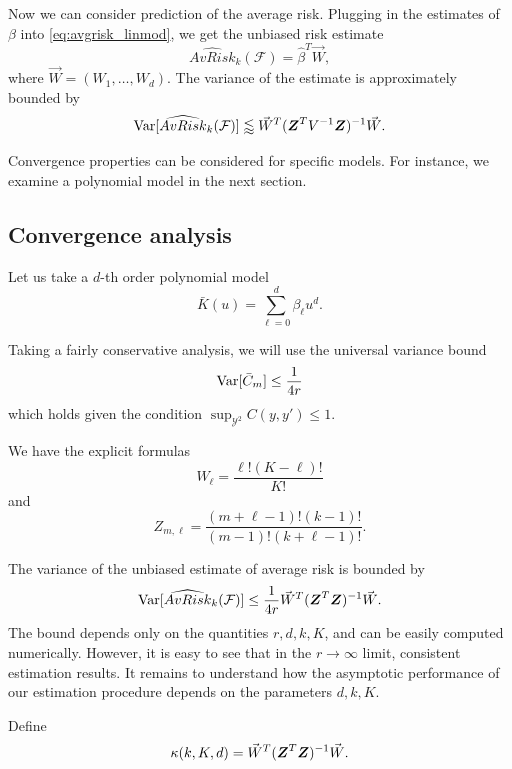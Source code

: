 \documentclass[12pt]{article}
\begin{document}
Now we can consider prediction of the average risk.
Plugging in the estimates of $\beta$ into \eqref{eq:avgrisk_linmod}, we get the unbiased risk estimate
\[
\widehat{AvRisk}_k(\mathcal{F}) = \hat{\beta}^T \vec{W},
\]
where $\vec{W} = (W_1,\hdots, W_d)$.
The variance of the estimate is approximately bounded by
\[
\text{Var}[\widehat{AvRisk}_k(\mathcal{F})] \lessapprox \vec{W}^T (\boldsymbol{Z}^T V^{-1} \boldsymbol{Z})^{-1} \vec{W}.
\]

Convergence properties can be considered for specific models.  For
instance, we examine a polynomial model in the next section.

\subsection{Convergence analysis}

Let us take a $d$-th order polynomial model
\[
\bar{K}(u) = \sum_{\ell = 0}^d \beta_\ell u^d.
\]

Taking a fairly conservative analysis, we will use the universal variance bound
\[
\text{Var}[\bar{C}_m] \leq \frac{1}{4r}
\]
which holds given the condition $\sup_{\mathcal{Y}^2} C(y, y') \leq 1.$

We have the explicit formulas
\[
W_\ell = \frac{\ell!(K-\ell)!}{K!}
\]
and
\[
Z_{m, \ell} = \frac{(m+\ell-1)!(k-1)!}{(m-1)!(k+\ell-1)!}.
\]

The variance of the unbiased estimate of average risk is bounded by
\[
\text{Var}[\widehat{AvRisk}_k(\mathcal{F})] \leq \frac{1}{4r} \vec{W}^T (\boldsymbol{Z}^T \boldsymbol{Z})^{-1} \vec{W}.
\]
The bound depends only on the quantities $r, d, k, K$, and can be
easily computed numerically.  However, it is easy to see that in the
$r \to \infty$ limit, consistent estimation results.  It remains to
understand how the asymptotic performance of our estimation procedure
depends on the parameters $d, k, K$.

Define
\[
\kappa(k, K, d) = \vec{W}^T (\boldsymbol{Z}^T \boldsymbol{Z})^{-1} \vec{W}.
\]
\end{document}
